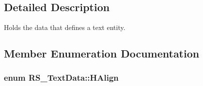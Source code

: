 \subsection{Detailed Description}
Holds the data that defines a text entity. 

\subsection{Member Enumeration Documentation}
\hypertarget{classRS__TextData_a70932aa9cb36e3b9cc11dc1029d3146d}{
\subsubsection[{H\-Align}]{\setlength{\rightskip}{0pt plus 5cm}enum {\bf R\-S\-\_\-\-Text\-Data\-::\-H\-Align}}}\label{classRS__TextData_a70932aa9cb36e3b9cc11dc1029d3146d}
